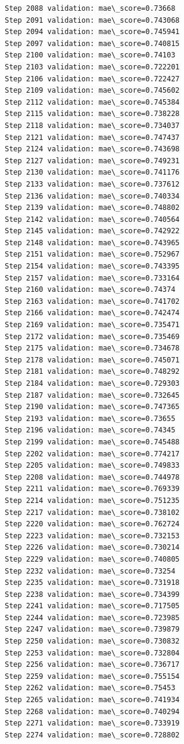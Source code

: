 \documentclass[11pt]{article}
\begin{document}
\begin{Verbatim}[commandchars=\\\{\}]
Step 2088 validation: mae\_score=0.73668
Step 2091 validation: mae\_score=0.743068
Step 2094 validation: mae\_score=0.745941
Step 2097 validation: mae\_score=0.740815
Step 2100 validation: mae\_score=0.74103
Step 2103 validation: mae\_score=0.722201
Step 2106 validation: mae\_score=0.722427
Step 2109 validation: mae\_score=0.745602
Step 2112 validation: mae\_score=0.745384
Step 2115 validation: mae\_score=0.738228
Step 2118 validation: mae\_score=0.734037
Step 2121 validation: mae\_score=0.747437
Step 2124 validation: mae\_score=0.743698
Step 2127 validation: mae\_score=0.749231
Step 2130 validation: mae\_score=0.741176
Step 2133 validation: mae\_score=0.737612
Step 2136 validation: mae\_score=0.740334
Step 2139 validation: mae\_score=0.748802
Step 2142 validation: mae\_score=0.740564
Step 2145 validation: mae\_score=0.742922
Step 2148 validation: mae\_score=0.743965
Step 2151 validation: mae\_score=0.752967
Step 2154 validation: mae\_score=0.743395
Step 2157 validation: mae\_score=0.733164
Step 2160 validation: mae\_score=0.74374
Step 2163 validation: mae\_score=0.741702
Step 2166 validation: mae\_score=0.742474
Step 2169 validation: mae\_score=0.735471
Step 2172 validation: mae\_score=0.735469
Step 2175 validation: mae\_score=0.734678
Step 2178 validation: mae\_score=0.745071
Step 2181 validation: mae\_score=0.748292
Step 2184 validation: mae\_score=0.729303
Step 2187 validation: mae\_score=0.732645
Step 2190 validation: mae\_score=0.747365
Step 2193 validation: mae\_score=0.73655
Step 2196 validation: mae\_score=0.74345
Step 2199 validation: mae\_score=0.745488
Step 2202 validation: mae\_score=0.774217
Step 2205 validation: mae\_score=0.749833
Step 2208 validation: mae\_score=0.744978
Step 2211 validation: mae\_score=0.769339
Step 2214 validation: mae\_score=0.751235
Step 2217 validation: mae\_score=0.738102
Step 2220 validation: mae\_score=0.762724
Step 2223 validation: mae\_score=0.732153
Step 2226 validation: mae\_score=0.730214
Step 2229 validation: mae\_score=0.740805
Step 2232 validation: mae\_score=0.73254
Step 2235 validation: mae\_score=0.731918
Step 2238 validation: mae\_score=0.734399
Step 2241 validation: mae\_score=0.717505
Step 2244 validation: mae\_score=0.723985
Step 2247 validation: mae\_score=0.739879
Step 2250 validation: mae\_score=0.730832
Step 2253 validation: mae\_score=0.732804
Step 2256 validation: mae\_score=0.736717
Step 2259 validation: mae\_score=0.755154
Step 2262 validation: mae\_score=0.75453
Step 2265 validation: mae\_score=0.741934
Step 2268 validation: mae\_score=0.740294
Step 2271 validation: mae\_score=0.733919
Step 2274 validation: mae\_score=0.728802

\end{Verbatim}
\end{document}
